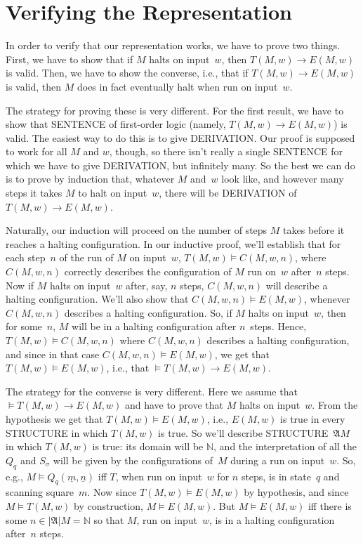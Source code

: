 \documentclass[10pt,a4paper]{article}
\newcommand*{\olup}[1]{\MakeUppercase{#1}}
\theoremstyle{plain}
\theoremstyle{definition}
\theoremstyle{remark}
\newenvironment{explain}{}{}
\newcommand*{\olfileid}[3]{}
\newcommand*{\olsection}[1]{\section*{#1}}
\providecommand{\lif}{\mathbin{\rightarrow}}
\providecommand{\Entails}{\mathrel{\models}}
\providecommand{\Obj}{}
\providecommand{\Struct}{\ensuremath{\mathfrak{A}}}
\providecommand{\Domain}{\ensuremath{|\mathfrak{A}|}}
\providecommand{\Sat}[2]{\ensuremath{#1 \models #2}}
\providecommand{\num}[1]{\underline{#1}}
\providecommand{\Nat}{\ensuremath{\mathbb{N}}}
\begin{document}



\olfileid{tur}{und}{ver} 
\olsection{Verifying the Representation}

\begin{explain}
In order to verify that our representation works, we have to prove two
things. First, we have to show that if $M$ halts on input~$w$, then
$T(M, w) \lif E(M, w)$ is valid. Then, we have to show the converse,
i.e., that if $T(M, w) \lif E(M, w)$ is valid, then $M$ does in fact
eventually halt when run on input~$w$.

The strategy for proving these is very different. For the first
result, we have to show that \olup{sentence} of first-order logic
(namely, $T(M, w) \lif E(M, w)$) is valid. The easiest way to do
this is to give \olup{derivation}. Our proof is supposed to work for all
$M$ and $w$, though, so there isn't really a single \olup{sentence} for
which we have to give \olup{derivation}, but infinitely many.  So the best
we can do is to prove by induction that, whatever $M$ and~$w$ look
like, and however many steps it takes $M$ to halt on input~$w$, there
will be \olup{derivation} of $T(M, w) \lif E(M, w)$.

Naturally, our induction will proceed on the number of steps $M$ takes
before it reaches a halting configuration. In our inductive proof,
we'll establish that for each step~$n$ of the run of $M$ on input~$w$,
$T(M, w) \Entails C(M, w, n)$, where $C(M, w, n)$ correctly
describes the configuration of $M$ run on~$w$ after~$n$ steps. Now if
$M$ halts on input~$w$ after, say, $n$ steps, $C(M, w, n)$ will
describe a halting configuration. We'll also show that $C(M, w, n)
\Entails E(M, w)$, whenever $C(M, w, n)$ describes a halting
configuration.  So, if $M$ halts on input~$w$, then for some~$n$, $M$
will be in a halting configuration after $n$~steps. Hence, $T(M, w)
\Entails C(M, w, n)$ where $C(M, w, n)$ describes a halting
configuration, and since in that case $C(M, w, n) \Entails E(M, w)$,
we get that $T(M, w) \Entails E(M, w)$, i.e., that $\Entails T(M, w)
\lif E(M, w)$.

The strategy for the converse is very different. Here we assume that
$\Entails T(M, w) \lif E(M, w)$ and have to prove that $M$ halts on
input~$w$.  From the hypothesis we get that $T(M, w) \Entails E(M,
w)$, i.e., $E(M, w)$ is true in every \olup{structure} in which $T(M,
w)$ is true. So we'll describe \olup{structure}~$\Struct{M}$ in which
$T(M, w)$ is true: its domain will be $\Nat$, and the interpretation
of all the $\Obj Q_q$ and $\Obj S_\sigma$ will be given by the
configurations of~$M$ during a run on input~$w$.  So, e.g.,
$\Sat{M}{\Obj Q_q(\num{m}, \num{n})}$ iff $T$, when run on input~$w$
for $n$ steps, is in state~$q$ and scanning square~$m$.  Now since
$T(M, w) \Entails E(M, w)$ by hypothesis, and since $\Sat{M}{T(M,
  w)}$ by construction, $\Sat{M}{E(M, w)}$.  But $\Sat{M}{E(M, w)}$
iff there is some $n \in \Domain{M} = \Nat$ so that $M$, run on
input~$w$, is in a halting configuration after~$n$ steps.
\end{explain}
\end{document}
